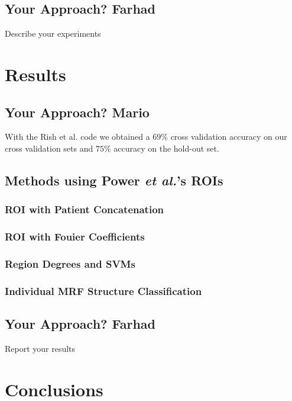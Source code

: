 \documentclass{article} %
\begin{document}
\subsection{Your Approach? Farhad}
Describe your experiments

\section{Results}

\subsection{Your Approach? Mario}
With the Rish et al. code we obtained a $ 69\%$ cross validation accuracy on our cross validation sets and $75 \%$ accuracy on the hold-out set.

\subsection{Methods using Power \emph{et al.}'s ROIs}

\subsubsection{ROI with Patient Concatenation}

\subsubsection{ROI with Fouier Coefficients}

\subsubsection{Region Degrees and SVMs}

\subsubsection{Individual MRF Structure Classification}

\subsection{Your Approach? Farhad}
Report your results

\section{Conclusions}





	
\end{document}
